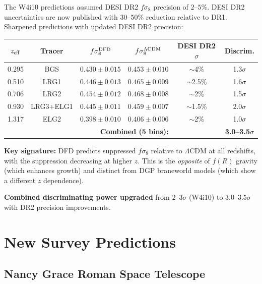 \documentclass[11pt,a4paper]{article}
\newcommand{\LCDM}{$\Lambda$CDM}
\begin{document}
\begin{predbox}

The W4i10 predictions assumed DESI DR2 $f\sigma_8$ precision of $2$--$5\%$.
DESI DR2 uncertainties are now published with $30$--$50\%$ reduction
relative to DR1. Sharpened predictions with updated DESI DR2 precision:

\begin{center}
\begin{tabular}{cccccc}
\toprule
$z_{\rm eff}$ & Tracer & $f\sigma_8^{\rm DFD}$ &
$f\sigma_8^{\Lambda\rm CDM}$ & DESI DR2 $\sigma$ &
Discrim. \\
\midrule
0.295 & BGS & $0.430 \pm 0.015$ & $0.453 \pm 0.010$ &
$\sim$4\% & 1.3$\sigma$ \\
0.510 & LRG1 & $0.446 \pm 0.013$ & $0.465 \pm 0.009$ &
$\sim$2.5\% & 1.6$\sigma$ \\
0.706 & LRG2 & $0.454 \pm 0.012$ & $0.468 \pm 0.008$ &
$\sim$2\% & 1.5$\sigma$ \\
0.930 & LRG3+ELG1 & $0.445 \pm 0.011$ & $0.459 \pm 0.007$ &
$\sim$1.5\% & 2.0$\sigma$ \\
1.317 & ELG2 & $0.398 \pm 0.010$ & $0.406 \pm 0.006$ &
$\sim$2\% & 1.0$\sigma$ \\
\midrule
\multicolumn{4}{r}{\textbf{Combined (5 bins):}} &
& \textbf{3.0--3.5$\sigma$} \\
\bottomrule
\end{tabular}
\end{center}

\textbf{Key signature:} DFD predicts suppressed $f\sigma_8$ relative to
\LCDM{} at all redshifts, with the suppression decreasing at higher $z$.
This is the \emph{opposite} of $f(R)$ gravity (which enhances growth)
and distinct from DGP braneworld models (which show a different $z$
dependence).

\textbf{Combined discriminating power upgraded} from $2$--$3\sigma$
(W4i10) to $3.0$--$3.5\sigma$ with DR2 precision improvements.
\end{predbox}

\section{New Survey Predictions}
\label{sec:new_surveys}

\subsection{Nancy Grace Roman Space Telescope}
\end{document}
